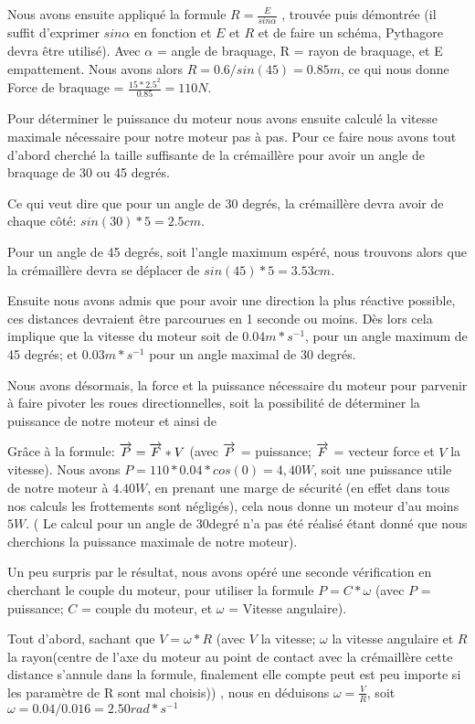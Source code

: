 Nous avons ensuite appliqué la formule   $R = \frac{E}{sin \alpha}$ , trouvée puis démontrée (il suffit d’exprimer $sin \alpha$ en fonction et $E$ et $R$ et de faire un schéma, Pythagore devra être utilisé). Avec $\alpha$ = angle de braquage, R = rayon de braquage, et E empattement. Nous avons alors $R = 0.6/sin(45) = 0.85m$, ce qui nous donne Force de braquage = $\frac{15*2.5^2}{0.85} = 110N$.

Pour déterminer le puissance du moteur nous avons ensuite calculé la vitesse maximale nécessaire pour notre moteur pas à pas.
Pour ce faire nous avons tout d’abord cherché la taille suffisante de la crémaillère pour avoir un angle de braquage de 30 ou  45 degrés.  

Ce qui veut dire que pour un angle de 30 degrés, la crémaillère devra avoir de chaque côté: $sin(30)*5 = 2.5 cm$.

Pour un angle de 45 degrés, soit l’angle maximum espéré, nous trouvons alors que la crémaillère devra se déplacer de $sin(45)*5 = 3.53cm$.

Ensuite nous avons admis que pour avoir une direction la plus réactive possible, ces distances devraient être parcourues en 1 seconde ou moins. Dès lors cela implique que la vitesse du moteur soit de $0.04m*s^{-1}$, pour un angle maximum de 45 degrés; et $0.03m*s^{-1}$ pour un angle maximal de 30 degrés.

Nous avons désormais, la force et la puissance nécessaire du moteur pour parvenir à faire pivoter les roues directionnelles, soit la possibilité de déterminer la puissance de notre moteur et ainsi de %

Grâce à la formule: $\overrightarrow{P} = \overrightarrow{F}*V$ (avec $\overrightarrow{P}$ = puissance; $\overrightarrow{F}$ = vecteur force et $V$ la vitesse). Nous avons $P= 110*0.04*cos(0) = 4,40 W$, soit une puissance utile de notre moteur à $4.40W$, en prenant une marge de sécurité (en effet dans tous nos calculs les frottements sont négligés), cela nous donne un moteur d’au moins $5W$. ( Le calcul pour un angle de 30degré n’a pas été réalisé étant donné que nous cherchions la puissance maximale de notre moteur).

Un peu surpris par le résultat, nous avons opéré une seconde vérification en cherchant le couple du moteur, pour utiliser la formule $P= C*\omega$ (avec $P$ = puissance; $C$ = couple du moteur, et $\omega$ = Vitesse angulaire).

Tout d’abord, sachant que  $V = \omega*R$ (avec $V$ la vitesse; $\omega$ la vitesse angulaire et $R$ la rayon(centre de l’axe du moteur au point de contact avec la crémaillère cette distance s’annule dans la formule, finalement elle compte peut est peu importe si les paramètre de R sont mal choisis))   , nous en déduisons $\omega = \frac{V}{R}$, soit $\omega = 0.04/0.016 = 2.50 rad*s^{-1}$

